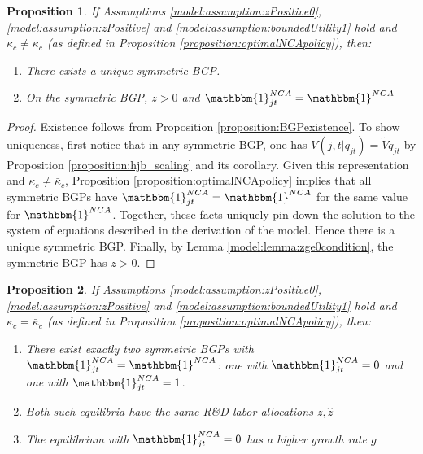 \documentclass[11pt,english]{article}
\newtheorem{proposition}{Proposition}
\begin{document}
\begin{proposition}\label{proposition:purstrategyeq:positiveOI}
	If Assumptions \ref{model:assumption:zPositive0}, \ref{model:assumption:zPositive} and \ref{model:assumption:boundedUtility1} hold and $\kappa_c \ne \bar{\kappa}_c$ (as defined in Proposition \ref{proposition:optimalNCApolicy}), then:
	\begin{enumerate}
		\item There exists a unique symmetric BGP.
		\item On the symmetric BGP, $z > 0$ and $\mathbbm{1}^{NCA}_{jt} = \mathbbm{1}^{NCA}$
	\end{enumerate}
\end{proposition}

\begin{proof}
	Existence follows from Proposition \ref{proposition:BGPexistence}. To show uniqueness, first notice that in any symmetric BGP, one has $V(j,t|\bar{q}_{jt}) = \tilde{V}\bar{q}_{jt}$ by Proposition \ref{proposition:hjb_scaling} and its corollary. Given this representation and $\kappa_c \ne \bar{\kappa}_c$, Proposition \ref{proposition:optimalNCApolicy} implies that all symmetric BGPs have $\mathbbm{1}^{NCA}_{jt} = \mathbbm{1}^{NCA}$ for the same value for $\mathbbm{1}^{NCA}$. Together, these facts uniquely pin down the solution to the system of equations described in the derivation of the model. Hence there is a unique symmetric BGP. Finally, by Lemma \ref{model:lemma:zge0condition}, the symmetric BGP has $z > 0$. 
\end{proof}

\begin{proposition}\label{proposition:purestrategyeq:incumbents_indifferent}
	If Assumptions \ref{model:assumption:zPositive0}, \ref{model:assumption:zPositive} and \ref{model:assumption:boundedUtility1} hold and $\kappa_c = \bar{\kappa}_c$ (as defined in Proposition \ref{proposition:optimalNCApolicy}), then:
	\begin{enumerate}
		\item There exist exactly two symmetric BGPs with $\mathbbm{1}^{NCA}_{jt} = \mathbbm{1}^{NCA}$: one with $\mathbbm{1}^{NCA}_{jt} = 0$ and one with $\mathbbm{1}^{NCA}_{jt} = 1$.
		\item Both such equilibria have the same R\&D labor allocations $z, \hat{z}$
		\item The equilibrium with $\mathbbm{1}^{NCA}_{jt} = 0$ has a higher growth rate $g$ 
	\end{enumerate} 
\end{proposition}
\end{document}
